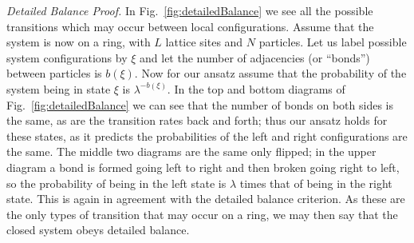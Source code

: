 \documentclass[
reprint,
 amsmath,amssymb,
 aps,
 prl,
]{revtex4-1}
\begin{document}
\textit{Detailed Balance Proof.} In Fig.~\ref{fig:detailedBalance} we see all the possible transitions which may occur between local configurations. Assume that the system is now on a ring, with $L$ lattice sites and $N$ particles.
Let us label possible system configurations by $\xi$ and let the number of adjacencies (or ``bonds'') between particles is $b(\xi)$. Now for our ansatz assume that the probability of the system being in state $\xi$ is $\lambda^{-b(\xi)}$.
In the top and bottom diagrams of Fig.~\ref{fig:detailedBalance} we can see that the number of bonds on both sides is the same, as are the transition rates back and forth; thus our ansatz holds for these states, as it predicts the probabilities
of the left and right configurations are the same. The middle two diagrams are the same only flipped; in the upper diagram a bond is formed going left to right and then broken going right to left, so the probability of being in the left state is
$\lambda$ times that of being in the right state. This is again in agreement with the detailed balance criterion. As these are the only types of transition that may occur on a ring, we may then say that the closed system obeys detailed balance.
\end{document}

